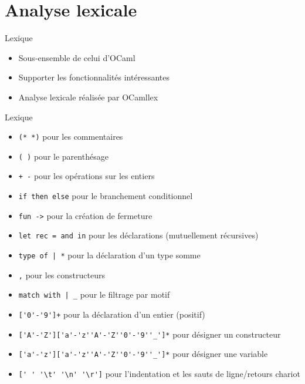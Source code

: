 \documentclass{beamer}
\begin{document}
\section{Analyse lexicale}

\fi

\begin{frame}{Lexique}
    \begin{itemize}
        \item Sous-ensemble de celui d'OCaml
        \item Supporter les fonctionnalités intéressantes
        \item Analyse lexicale réalisée par OCamllex
    \end{itemize}
\end{frame}

\iffalse
\begin{frame}[fragile]{Lexique}
    \begin{itemize}
        \item \lstinline{(* *)} pour les commentaires
        \item \lstinline{( )} pour le parenthésage
        \item \lstinline{+ -} pour les opérations sur les entiers
        \item \lstinline{if then else} pour le branchement conditionnel
        \item \lstinline{fun ->} pour la création de fermeture
        \item \lstinline{let rec = and in} pour les déclarations (mutuellement récursives)
        \item \lstinline{type of | *} pour la déclaration d'un type somme
        \item \lstinline{,} pour les constructeurs
        \item \lstinline{match with | _} pour le filtrage par motif
        \item \lstinline{['0'-'9']+} pour la déclaration d'un entier (positif)
        \item \lstinline{['A'-'Z']['a'-'z''A'-'Z''0'-'9''_']*} pour désigner un constructeur
        \item \lstinline{['a'-'z']['a'-'z''A'-'Z''0'-'9''_']*} pour désigner une variable
        \item \lstinline{[' ' '\t' '\n' '\r']} pour l'indentation et les sauts de ligne/retours chariot
    \end{itemize}
\end{frame}
\end{document}
